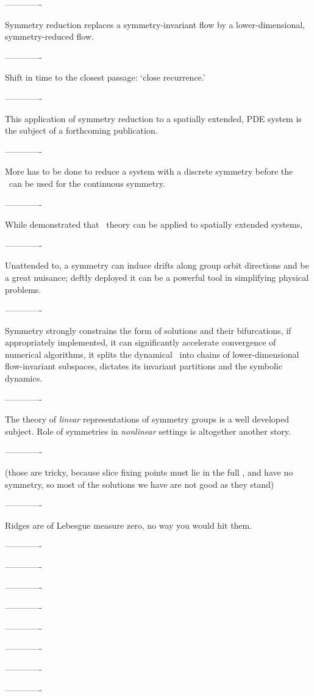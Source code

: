 -------------

Symmetry reduction replaces a symmetry-invariant flow by a
lower-dimensional, symmetry-reduced flow.

-------------

Shift in time to the closest passage:
`close recurrence.'

-------------

This application of symmetry reduction to a spatially extended, PDE
system is the subject of a forthcoming publication.

-------------

More has to be done to reduce a system with a discrete
symmetry before the \mslices\ can be used for the continuous symmetry.

-------------

While  demonstrated that \po\ theory can be
applied to spatially extended systems,

-------------

Unattended to, a symmetry can induce drifts along group orbit directions
and be a great nuisance; deftly deployed
it can be a powerful tool in simplifying physical problems.

-------------

Symmetry strongly constrains the form of solutions and their
bifurcations, if appropriately implemented, it can significantly
accelerate convergence of numerical algorithms, it splits the dynamical
\statesp\ into chains of lower-dimensional flow-invariant subspaces,
dictates its invariant partitions and the symbolic dynamics.

-------------

The theory of \emph{linear} representations of symmetry groups is
a well developed subject. Role of symmetries in
\emph{nonlinear} settings is altogether another story.

-------------

 (those are tricky, because slice fixing points
must lie in the full \statesp, and have no symmetry, so most of the
solutions we have are not good as they stand)

-------------

Ridges are of Lebesgue measure zero, no way you would hit them.

-------------


-------------

-------------

-------------

-------------

-------------

-------------

-------------
